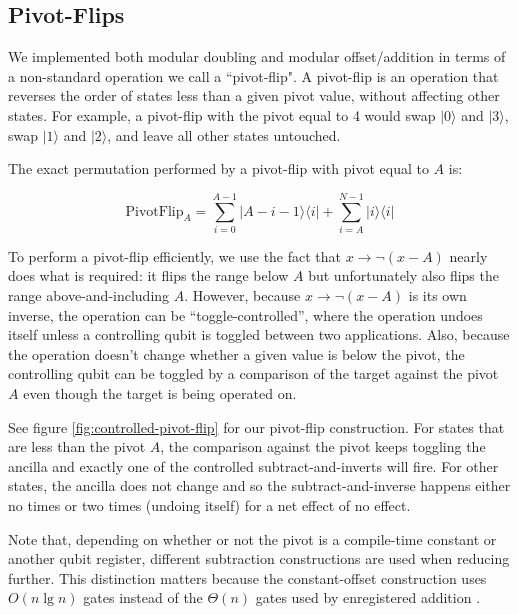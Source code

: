 \documentclass[twocolumn]{article}
\begin{document}
\subsection{Pivot-Flips} \label{sec:pivot-flips}

We implemented both modular doubling and modular offset/addition in terms of a non-standard operation we call a ``pivot-flip".
A pivot-flip is an operation that reverses the order of states less than a given pivot value, without affecting other states.
For example, a pivot-flip with the pivot equal to 4 would swap $|0\rangle$ and $|3\rangle$, swap $|1\rangle$ and $|2\rangle$, and leave all other states untouched.

The exact permutation performed by a pivot-flip with pivot equal to $A$ is:

$$\text{PivotFlip}_A = \sum_{i=0}^{A-1} |A-i-1\rangle \langle i| + \sum_{i=A}^{N-1} |i\rangle \langle i|$$

To perform a pivot-flip efficiently, we use the fact that $x \rightarrow \lnot(x - A)$ nearly does what is required: it flips the range below $A$ but unfortunately also flips the range above-and-including $A$.
However, because $x \rightarrow \lnot(x - A)$ is its own inverse, the operation can be ``toggle-controlled'', where the operation undoes itself unless a controlling qubit is toggled between two applications.
Also, because the operation doesn't change whether a given value is below the pivot, the controlling qubit can be toggled by a comparison of the target against the pivot $A$ even though the target is being operated on.

See figure \ref{fig:controlled-pivot-flip} for our pivot-flip construction.
For states that are less than the pivot $A$, the comparison against the pivot keeps toggling the ancilla and exactly one of the controlled subtract-and-inverts will fire.
For other states, the ancilla does not change and so the subtract-and-inverse happens either no times or two times (undoing itself) for a net effect of no effect.

Note that, depending on whether or not the pivot is a compile-time constant or another qubit register, different subtraction constructions are used when reducing further.
This distinction matters because the constant-offset construction uses $O(n \lg n)$ gates \cite{haner2016} instead of the $\Theta(n)$ gates used by enregistered addition \cite{takahashi2005}.
\end{document}

